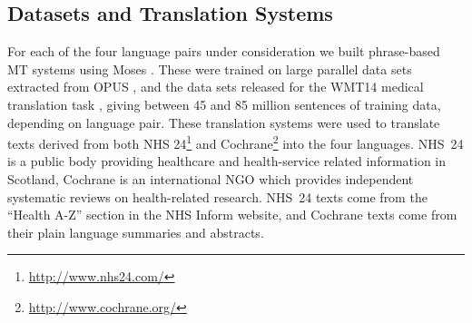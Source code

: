 \documentclass[11pt,letterpaper]{article}
\newcommand{\oa}[1]{}
\newcommand{\bh}[1]{\footnote{\color{blue}BH: #1}}
\def\parcite#1{\cite{#1}}
\begin{document}




\subsection{Datasets and Translation Systems}

For each of the four language pairs under consideration  we built phrase-based MT systems
using Moses \parcite{Koehn:2007}.  These were trained on large parallel data sets extracted from
OPUS \parcite{tiedemann:2009}, and the data sets released for the WMT14
medical translation task \parcite{bojar-EtAl:2014:W14-33}, 
giving between 45 and 85 million sentences of training data, depending on language pair.
These translation systems were used to translate texts derived from both NHS
24\footnote{\url{http://www.nhs24.com/}} and
Cochrane\footnote{\url{http://www.cochrane.org/}} into the four languages.
NHS~24 is a public body providing healthcare and health-service
related information in Scotland, Cochrane is an international NGO
which provides independent systematic reviews on health-related research.
NHS~24 texts come from the ``Health A-Z'' section in the NHS Inform
website, and Cochrane texts come from their plain language summaries
and abstracts.

\end{document}

